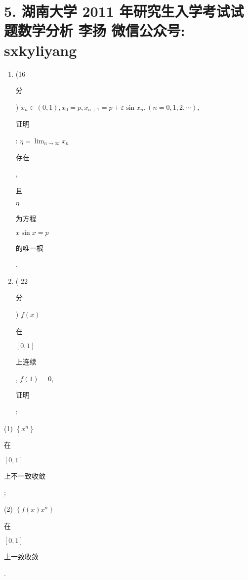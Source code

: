 \documentclass[10pt]{article}
\begin{document}
\section{5. 湖南大学 2011 年研究生入学考试试题数学分析 
 李扬 
 微信公众号: sxkyliyang}
\begin{enumerate}
  \item (16 \begin{CJK}{UTF8}{mj}分\end{CJK}) $x_{n} \in(0,1), x_{0}=p, x_{n+1}=p+\varepsilon \sin x_{n},(n=0,1,2, \cdots)$, \begin{CJK}{UTF8}{mj}证明\end{CJK}: $\eta=\lim _{n \rightarrow \infty} x_{n}$ \begin{CJK}{UTF8}{mj}存在\end{CJK}, \begin{CJK}{UTF8}{mj}且\end{CJK} $\eta$ \begin{CJK}{UTF8}{mj}为方程\end{CJK} $x \sin x=p$ \begin{CJK}{UTF8}{mj}的唯一根\end{CJK}.

  \item ( 22 \begin{CJK}{UTF8}{mj}分\end{CJK}) $f(x)$ \begin{CJK}{UTF8}{mj}在\end{CJK} $[0,1]$ \begin{CJK}{UTF8}{mj}上连续\end{CJK}, $f(1)=0$, \begin{CJK}{UTF8}{mj}证明\end{CJK}:

\end{enumerate}
(1) $\left\{x^{n}\right\}$ \begin{CJK}{UTF8}{mj}在\end{CJK} $[0,1]$ \begin{CJK}{UTF8}{mj}上不一致收敛\end{CJK};

(2) $\left\{f(x) x^{n}\right\}$ \begin{CJK}{UTF8}{mj}在\end{CJK} $[0,1]$ \begin{CJK}{UTF8}{mj}上一致收敛\end{CJK}.
\end{document}
